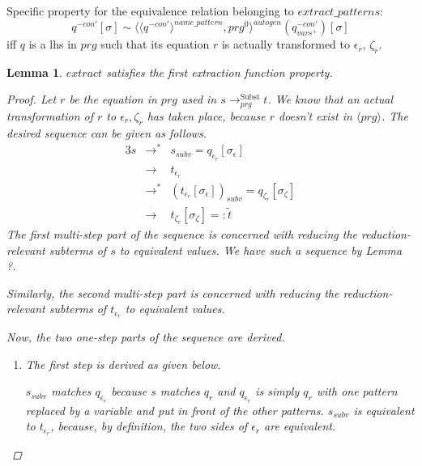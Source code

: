 \documentclass[11pt]{article} %
\newtheorem*{lemma*}{Lemma}
\begin{document}
Specific property for the equivalence relation belonging to $extract\_patterns$:
\begin{equation*}
q^{-con'}[\sigma] \sim \langle \langle q^{-con'} \rangle^{name\_pattern}, prg^0 \rangle^{autogen}(q^{-con'}_{vars^+})[\sigma]
\end{equation*}
iff $q$ is a lhs in $prg$ such that its equation $r$ is actually transformed to $\epsilon_r$, $\zeta_r$.

\begin{lemma*}

$extract$ satisfies the first extraction function property.

\begin{proof}

Let $r$ be the equation in $prg$ used in $s \longrightarrow^{\textrm{Subst}}_{prg} t$. We know that an actual transformation of $r$ to $\epsilon_r, \zeta_r$ has taken place, because $r$ doesn't exist in $\langle prg \rangle$. The desired sequence can be given as follows.
\begin{alignat*}{3}
s &\longrightarrow^* &s_{subv} = q_{\epsilon_r}[\sigma_\epsilon]\\
&\longrightarrow &t_{\epsilon_r}\\
&\longrightarrow^*  &(t_{\epsilon_r}[\sigma_\epsilon])_{subv} = q_{\zeta_r}[\sigma_\zeta]\\
&\longrightarrow &t_{\zeta_r}[\sigma_\zeta] =: \widetilde{t}
\end{alignat*}
The first multi-step part of the sequence is concerned with reducing the reduction-relevant subterms of $s$ to equivalent values. We have such a sequence by Lemma ?.

Similarly, the second multi-step part is concerned with reducing the reduction-relevant subterms of $t_{\epsilon_r}$ to equivalent values.

Now, the two one-step parts of the sequence are derived.

\begin{enumerate}
\item The first step is derived as given below.
\begin{prooftree}
\end{prooftree}
$s_{subv}$ matches $q_{\epsilon_r}$ because $s$ matches $q_r$ and $q_{\epsilon_r}$ is simply $q_r$ with one pattern replaced by a variable and put in front of the other patterns. $s_{subv}$ is equivalent to $t_{\epsilon_r}$, because, by definition, the two sides of $\epsilon_r$ are equivalent.


\end{enumerate}
\end{proof}
\end{lemma*}
\end{document}
